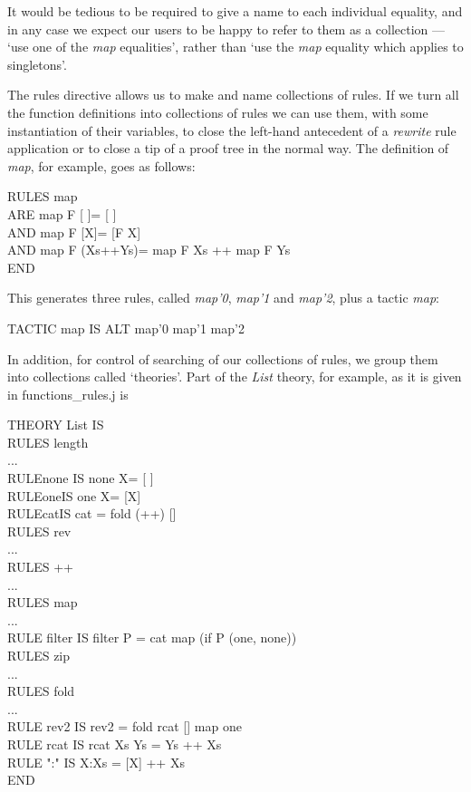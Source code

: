It would be tedious to be required to give a name to each individual equality, and in any case we expect our users to be happy to refer to them as a collection --- `use one of the \textit{map} equalities', rather than `use the \textit{map} equality which applies to singletons'.


The rules directive allows us to make and name collections of rules. If we turn all the function definitions into collections of rules we can use them, with some instantiation of their variables, to close the left-hand antecedent of a \textit{rewrite} rule application or to close a tip of a proof tree in the normal way. The definition of \textit{map}, for example, goes as follows:

RULES map\\
\tab ARE map F [ ]\tab = [ ]\\
\tab AND map F [X]\tab = [F X]\\
\tab AND map F (Xs++Ys)\tab = map F Xs ++ map F Ys\\
END


This generates three rules, called \textit{map'0}, \textit{map'1} and \textit{map'2}, plus a tactic \textit{map}:

TACTIC map IS ALT map'0 map'1 map'2


In addition, for control of searching of our collections of rules, we group them into collections called `theories'. Part of the \textit{List} theory, for example, as it is given in functions\_rules.j is

THEORY List IS\\
\tab RULES length \\
\tab ...\\
\tab RULE\tab none \tab IS none X\tab = [ ]\\
\tab RULE\tab one\tab IS one X\tab = [X]\\
\tab RULE\tab cat\tab IS cat = fold (++) []\\
\tab RULES rev\\
\tab ...\\
\tab RULES ++\\
\tab ...\\
\tab RULES map\\
\tab ...\\
\tab RULE filter IS filter P = cat {\textbullet} map (if P (one, none))\\
\tab RULES zip\\
\tab ...\\
\tab RULES fold \\
\tab ...\\
\tab RULE rev2 IS rev2 = fold rcat [] {\textbullet} map one\\
\tab RULE rcat IS rcat Xs Ys = Ys ++ Xs\\
\tab RULE ":" IS X:Xs = [X] ++ Xs\\
END


